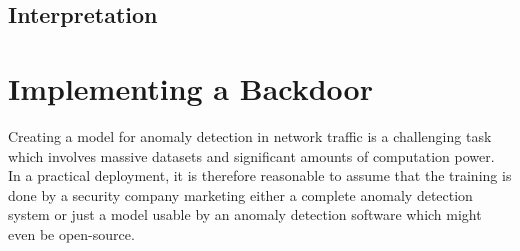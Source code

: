 \documentclass[sigconf,nonacm]{acmart}
\begin{document}
\begin{table}
\begin{tabular}{l r r}
\bottomrule
\end{tabular}
\end{table}

\subsection{Interpretation}
\section{Implementing a Backdoor}
Creating a model for anomaly detection in network traffic is a challenging task which involves massive datasets and significant amounts of computation power. In a practical deployment, it is therefore reasonable to assume that the training is done by a security company marketing either a complete anomaly detection system or just a model usable by an anomaly detection software which might even be open-source.
\end{document}
